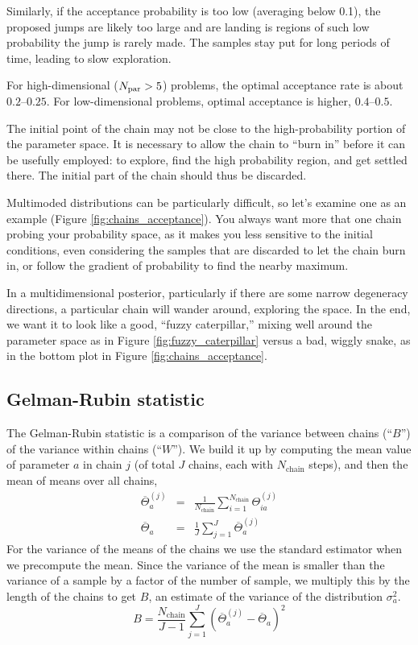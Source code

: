 Similarly, if the acceptance probability is too low (averaging below 0.1), the proposed jumps are likely too large and are landing is regions of such low probability the jump is rarely made.  The samples stay put for long periods of time, leading to slow exploration.

For high-dimensional ($N_{\rm par} > 5$) problems, the optimal acceptance rate is about $ 0.2$--$0.25$.  For low-dimensional problems, optimal acceptance is higher, $ 0.4$--$0.5$.

The initial point of the chain may not be close to the high-probability portion of the parameter space.  It is necessary to allow the chain to ``burn in'' before it can be usefully employed: to explore, find the high probability region, and get settled there.  The initial part of the chain should thus be discarded.

Multimoded distributions can be particularly difficult, so let's examine one as an example (Figure \ref{fig:chains_acceptance}).  You always want more that one chain probing your probability space, as it makes you less sensitive to the initial conditions, even considering the samples that are discarded to let the chain burn in, or follow the gradient of probability to find the nearby maximum.

In a multidimensional posterior, particularly if there are some narrow degeneracy directions, a particular chain will wander around, exploring the space.  In the end, we want it to look like a good, ``fuzzy caterpillar,'' mixing well around the parameter space as in Figure \ref{fig:fuzzy_caterpillar} versus a bad, wiggly snake, as in the bottom plot in Figure \ref{fig:chains_acceptance}.

\subsection{Gelman-Rubin statistic}
The Gelman-Rubin statistic is a comparison of the variance between chains (``$B$'') of the variance within chains (``$W$'').
We build it up by computing the mean value of parameter $a$ in chain $j$ (of total $J$ chains, each with $N_\textrm{chain}$ steps), and then the mean of means over all chains,
\begin{eqnarray}
  \overline{\Theta}^{(j)}_{a}&=&\frac{1}{N_\textrm{chain}}\sum_{i=1}^{N_\textrm{chain}} \Theta_{ia}^{(j)} \\
  \overline{\Theta}_{a}&=&\frac{1}{J}\sum_{j=1}^J \overline{\Theta}^{(j)}_{a}
\end{eqnarray} 
For the variance of the means of the chains we use the standard estimator when we precompute the mean.  Since the variance of the mean is smaller than the variance of a sample by a factor of the number of sample, we multiply this by the length of the chains to get $B$, an estimate of the variance of the distribution $\sigma^2_a$.
  \begin{equation}B=\frac{N_\textrm{chain}}{J-1}\sum_{j=1}^J \left(\overline{\Theta}^{(j)}_{a}-\overline{\Theta}_{a} \right)^2\end{equation}

